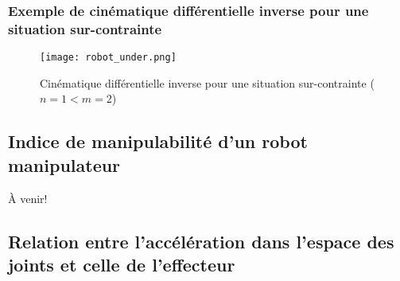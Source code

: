 \subsubsection{Exemple de cinématique différentielle inverse pour une situation sur-contrainte}
\begin{figure}[H]
	\centering
		\texttt{[image: robot\_under.png]}
	\caption{Cinématique différentielle inverse pour une situation sur-contrainte ($n=1<m=2$)}
	\label{fig:robot_under}
\end{figure}



\newpage
\subsection{Indice de manipulabilité d'un robot manipulateur}

À venir!



\newpage
\subsection{Relation entre l'accélération dans l'espace des joints et celle de l'effecteur}
\label{sec:accjointspace}


